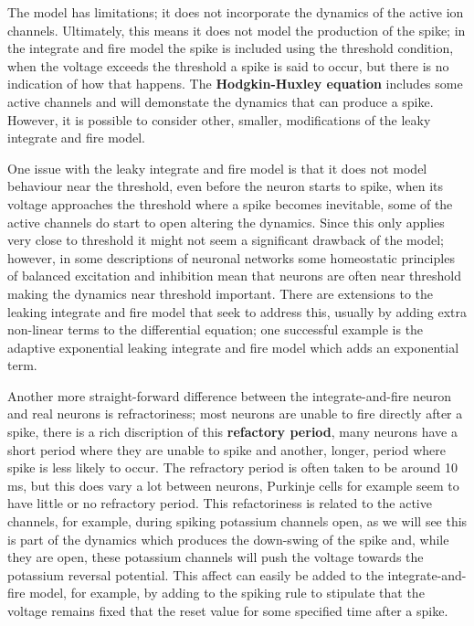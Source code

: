\documentclass{article}
\begin{document}
The model has limitations; it does not incorporate the dynamics of the
active ion channels. Ultimately, this means it does not model the
production of the spike; in the integrate and fire model the spike is
included using the threshold condition, when the voltage exceeds the
threshold a spike is said to occur, but there is no indication of how
that happens. The \textbf{Hodgkin-Huxley equation} includes some
active channels and will demonstate the dynamics that can produce a
spike. However, it is possible to consider other, smaller,
modifications of the leaky integrate and fire model.

One issue with the leaky integrate and fire model is that it does not
model behaviour near the threshold, even before the neuron starts to
spike, when its voltage approaches the threshold where a spike becomes
inevitable, some of the active channels do start to open altering the
dynamics. Since this only applies very close to threshold it might not
seem a significant drawback of the model; however, in some
descriptions of neuronal networks some homeostatic principles of
balanced excitation and inhibition mean that neurons are often near
threshold making the dynamics near threshold important. There are
extensions to the leaking integrate and fire model that seek to
address this, usually by adding extra non-linear terms to the
differential equation; one successful example is the adaptive
exponential leaking integrate and fire model which adds an exponential
term.

Another more straight-forward difference between the
integrate-and-fire neuron and real neurons is refractoriness; most
neurons are unable to fire directly after a spike, there is a rich
discription of this \textbf{refactory period}, many neurons have a
short period where they are unable to spike and another, longer,
period where spike is less likely to occur. The refractory period is
often taken to be around 10 ms, but this does vary a lot between
neurons, Purkinje cells for example seem to have little or no
refractory period. This refactoriness is related to the active
channels, for example, during spiking potassium channels open, as we
will see this is part of the dynamics which produces the down-swing of
the spike and, while they are open, these potassium channels will push
the voltage towards the potassium reversal potential. This affect can
easily be added to the integrate-and-fire model, for example, by
adding to the spiking rule to stipulate that the voltage remains fixed
that the reset value for some specified time after a spike.
\end{document}
